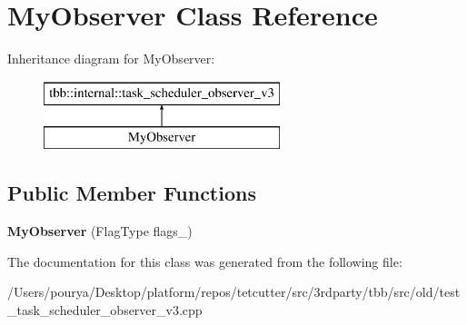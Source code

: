 \hypertarget{classMyObserver}{}\section{My\+Observer Class Reference}
\label{classMyObserver}
Inheritance diagram for My\+Observer\+:\begin{figure}[H]
\begin{center}
\leavevmode
\includegraphics[height=2.000000cm]{classMyObserver}
\end{center}
\end{figure}
\subsection*{Public Member Functions}
\begin{DoxyCompactItemize}
\item 
\hypertarget{classMyObserver_a45fd5a22fb7960189485d5d132b13b54}{}{\bfseries My\+Observer} (Flag\+Type flags\+\_\+)\label{classMyObserver_a45fd5a22fb7960189485d5d132b13b54}

\end{DoxyCompactItemize}


The documentation for this class was generated from the following file\+:\begin{DoxyCompactItemize}
\item 
/\+Users/pourya/\+Desktop/platform/repos/tetcutter/src/3rdparty/tbb/src/old/test\+\_\+task\+\_\+scheduler\+\_\+observer\+\_\+v3.\+cpp\end{DoxyCompactItemize}
